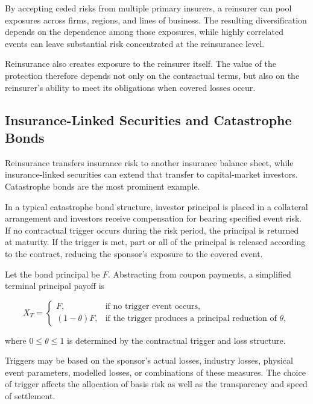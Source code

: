 By accepting ceded risks from multiple primary insurers, a reinsurer can pool exposures across firms, regions, and lines of business. The resulting diversification depends on the dependence among those exposures, while highly correlated events can leave substantial risk concentrated at the reinsurance level.

Reinsurance also creates exposure to the reinsurer itself. The value of the protection therefore depends not only on the contractual terms, but also on the reinsurer's ability to meet its obligations when covered losses occur.


\subsection{Insurance-Linked Securities and Catastrophe Bonds}

Reinsurance transfers insurance risk to another insurance balance sheet, while insurance-linked securities can extend that transfer to capital-market investors. Catastrophe bonds are the most prominent example.

In a typical catastrophe bond structure, investor principal is placed in a collateral arrangement and investors receive compensation for bearing specified event risk. If no contractual trigger occurs during the risk period, the principal is returned at maturity. If the trigger is met, part or all of the principal is released according to the contract, reducing the sponsor's exposure to the covered event.

Let the bond principal be $F$. Abstracting from coupon payments, a simplified terminal principal payoff is

\begin{equation}
X_T=
\begin{cases}
F, & \text{if no trigger event occurs},\\
(1-\theta)F, & \text{if the trigger produces a principal reduction of } \theta,
\end{cases}
\label{eq:ch15-cat-bond-payoff}
\end{equation}

where $0\leq\theta\leq1$ is determined by the contractual trigger and loss structure.

Triggers may be based on the sponsor's actual losses, industry losses, physical event parameters, modelled losses, or combinations of these measures. The choice of trigger affects the allocation of basis risk as well as the transparency and speed of settlement.

